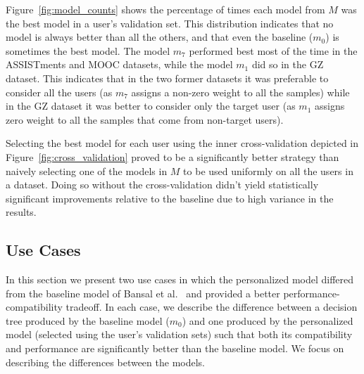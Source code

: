 \documentclass[letterpaper]{article} %
\theoremstyle{definition}
\begin{document}
Figure~\ref{fig:model_counts} shows the percentage of times each model from $M$ was the best model in a user's validation set. This distribution indicates that no model is always better than all the others, and that even the baseline ($m_0$) is sometimes the best model.
%
The model $m_7$ performed best most of the time in the ASSISTments and MOOC datasets, while the model $m_1$ did so in the GZ dataset. This indicates that in the two former datasets it was preferable to consider all the users (as $m_7$ assigns a non-zero weight to all the samples) while in the GZ dataset it was better to consider only the target user (as $m_1$ assigns zero weight to all the samples that come from non-target users).

Selecting the best model for each user using the inner cross-validation depicted in Figure~\ref{fig:cross_validation} proved to be a significantly better strategy than naively selecting one of the models in $M$ to be used uniformly on all the users in a dataset. Doing so without the cross-validation didn't yield statistically significant improvements relative to the baseline due to high variance in the results.

\subsection{Use Cases}
\label{sec:user_cases}
%
In this section we present two use cases in which the personalized model differed from the baseline model of Bansal et al.~ and provided a better performance-compatibility tradeoff.
In each case, we describe the difference between a decision tree produced by the baseline model ($m_0$) and one produced by the personalized model (selected using the user's validation sets) such that both its compatibility and performance are significantly better than the baseline model.
We focus on describing the differences between the models.
\end{document}
